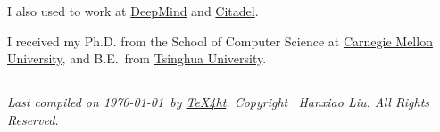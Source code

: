 \documentclass{article}
\begin{document}
I also used to work at \href{https://deepmind.com/}{DeepMind} and \href{https://www.citadel.com/}{Citadel}.

\noindent I received my Ph.D. from
the School of Computer Science at
\href{http://www.cmu.edu/index.shtml}{Carnegie Mellon University},
and B.E.\ from
\href{https://en.wikipedia.org/wiki/Tsinghua_University}{Tsinghua University}.

\subsection*{}
\footnotesize{
    \textit{
        Last compiled on \today\ by \href{http://www.tug.org/tex4ht/}{\TeX4ht}. \newline
        Copyright \the\year\ Hanxiao Liu. All Rights Reserved.
    }
}
\end{document}
